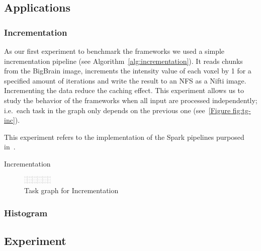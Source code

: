\documentclass[conference]{IEEEtran}
\begin{document}
\subsection{Applications}

\subsubsection{\textbf{Incrementation}}
As our first experiment to benchmark the frameworks we used a simple incrementation
pipeline (see Algorithm~\ref{alg:incrementation}). It reads chunks from the BigBrain
image, increments the intensity value of each voxel by 1 for a specified amount of
iterations and write the result to an NFS as a Nifti image. Incrementing the data
reduce the caching effect. This experiment allows us to study the behavior of the
frameworks when all input are processed independently; i.e.\ each task in the graph
only depends on the previous one (see~\ref{Figure fig:tg-inc}).

This experiment refers to the implementation of the Spark pipelines purposed
in~\cite{Hayot-Sasson:17}.

\begin{algorithm}[!t]
    \caption{Incrementation}\label{alg:incrementation}
    \begin{algorithmic}
        \EndFor
    \EndFor
\end{algorithmic}
\end{algorithm}

\begin{figure}[!t]
    \centering
    \includegraphics[width=0.125\textwidth,
    angle=-90]{images/incrementation-task-graph.png}
    \caption{Task graph for Incrementation}\label{fig:tg-inc}
\end{figure}

\subsubsection{Histogram}


\subsection{Experiment}
\end{document}
